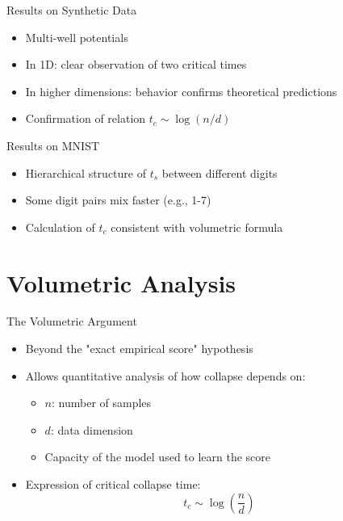 \documentclass[aspectratio=169]{beamer}
\begin{document}
\begin{frame}{Results on Synthetic Data}
    \begin{itemize}
        \item Multi-well potentials
        \item In 1D: clear observation of two critical times
        \item In higher dimensions: behavior confirms theoretical predictions
        \item Confirmation of relation $t_c \sim \log(n/d)$
    \end{itemize}
    
    \begin{center}
    \end{center}
\end{frame}

\begin{frame}{Results on MNIST}
    \begin{itemize}
        \item Hierarchical structure of $t_s$ between different digits
        \item Some digit pairs mix faster (e.g., 1-7)
        \item Calculation of $t_c$ consistent with volumetric formula
    \end{itemize}
\end{frame}

\section{Volumetric Analysis}

\begin{frame}{The Volumetric Argument}
    \begin{itemize}
        \item Beyond the "exact empirical score" hypothesis
        \item Allows quantitative analysis of how collapse depends on:
        \begin{itemize}
            \item $n$: number of samples
            \item $d$: data dimension
            \item Capacity of the model used to learn the score
        \end{itemize}
        \item Expression of critical collapse time:
        \begin{equation}
            t_c \sim \log\left(\frac{n}{d}\right)
        \end{equation}
    \end{itemize}
\end{frame}
\end{document}
